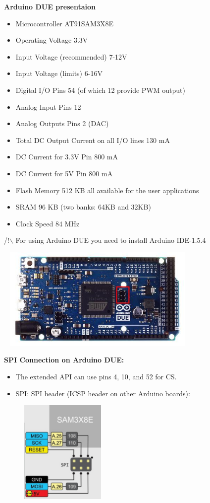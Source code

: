 \documentclass[10pt,a4paper]{report}
\begin{document}
\textbf{Arduino DUE presentaion}\\
\begin{itemize}
\item Microcontroller	 	AT91SAM3X8E
\item Operating Voltage	 	3.3V
\item Input Voltage (recommended)	 	7-12V
\item Input Voltage (limits)	 	6-16V
\item Digital I/O Pins	 	54 (of which 12 provide PWM output)
\item Analog Input Pins	 	12
\item Analog Outputs Pins	 	2 (DAC)
\item Total DC Output Current on all I/O lines	 	130 mA
\item DC Current for 3.3V Pin	 	800 mA
\item DC Current for 5V Pin	 	800 mA
\item Flash Memory	 	512 KB all available for the user applications
\item SRAM	 	96 KB (two banks: 64KB and 32KB)
\item Clock Speed	 	84 MHz
\end{itemize}

/!$\backslash$ For using Arduino DUE you need to install Arduino IDE-1.5.4

\begin{center}
\includegraphics[width=10cm,height=50mm]{arduinodue}\\
\end{center}
\textbf{SPI Connection on Arduino DUE:}
\begin{itemize}
\item The extended API can use pins 4, 10, and 52 for CS.
\item SPI: SPI header (ICSP header on other Arduino boards):\\
\begin{center}
\includegraphics[width=5cm,height=5cm]{spidue}\\
\end{center}
\end{itemize}
\end{document}
